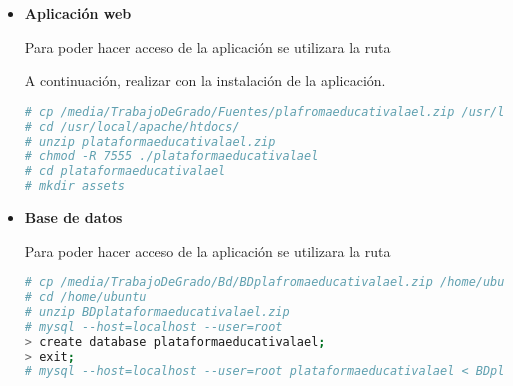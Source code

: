 \begin{itemize}

\item \textbf{Aplicación web}

Para poder hacer acceso de la aplicación se utilizara la ruta 

A continuación, realizar con la instalación de la aplicación.

\begin{lstlisting}[language=bash, caption={}]
# cp /media/TrabajoDeGrado/Fuentes/plafromaeducativalael.zip /usr/local/apache/htdocs/
# cd /usr/local/apache/htdocs/
# unzip plataformaeducativalael.zip
# chmod -R 7555 ./plataformaeducativalael
# cd plataformaeducativalael
# mkdir assets
\end{lstlisting}

\item \textbf{Base de datos}

Para poder hacer acceso de la aplicación se utilizara la ruta 

\begin{lstlisting}[language=bash, caption={}]
# cp /media/TrabajoDeGrado/Bd/BDplafromaeducativalael.zip /home/ubuntu
# cd /home/ubuntu
# unzip BDplataformaeducativalael.zip
# mysql --host=localhost --user=root
> create database plataformaeducativalael;
> exit;
# mysql --host=localhost --user=root plataformaeducativalael < BDplataformaeducativalael.sql
\end{lstlisting}
\end{itemize}
